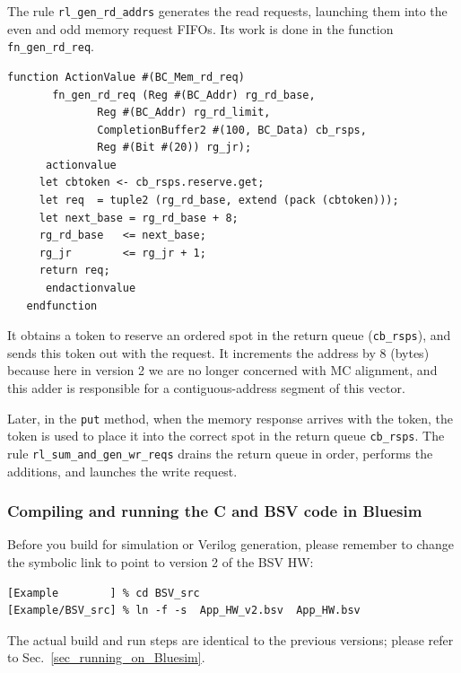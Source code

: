 \documentclass[twoside,letterpaper,11pt]{article}
\begin{document}
The rule \verb|rl_gen_rd_addrs| generates the read requests, launching
them into the even and odd memory request FIFOs.  Its work is done in
the function \verb|fn_gen_rd_req|.

\begin{Verbatim}[frame=single, label=App\_HW\_v2.bsv] 
   function ActionValue #(BC_Mem_rd_req)
       fn_gen_rd_req (Reg #(BC_Addr) rg_rd_base,
		      Reg #(BC_Addr) rg_rd_limit,
		      CompletionBuffer2 #(100, BC_Data) cb_rsps,
		      Reg #(Bit #(20)) rg_jr);
      actionvalue
	 let cbtoken <- cb_rsps.reserve.get;
	 let req  = tuple2 (rg_rd_base, extend (pack (cbtoken)));
	 let next_base = rg_rd_base + 8;
	 rg_rd_base   <= next_base;
	 rg_jr        <= rg_jr + 1;
	 return req;
      endactionvalue
   endfunction
\end{Verbatim}

It obtains a token to reserve an ordered spot in the return queue
(\verb|cb_rsps|), and sends this token out with the request.  It
increments the address by 8 (bytes) because here in version 2 we are
no longer concerned with MC alignment, and this adder is responsible
for a contiguous-address segment of this vector.

Later, in the \verb|put| method, when the memory response arrives with
the token, the token is used to place it into the correct spot in the
return queue \verb|cb_rsps|.  The rule \verb|rl_sum_and_gen_wr_reqs|
drains the return queue in order, performs the additions, and launches
the write request.


\subsubsection{Compiling and running the C and BSV code in Bluesim}

Before you build for simulation or Verilog generation, please remember
to change the symbolic link to point to version 2 of the BSV HW:

\begin{Verbatim}[frame=single, label=Properly named App\_HW.bsv application source file] 
[Example        ] % cd BSV_src
[Example/BSV_src] % ln -f -s  App_HW_v2.bsv  App_HW.bsv
\end{Verbatim}

The actual build and run steps are identical to the previous versions;
please refer to Sec.~\ref{sec_running_on_Bluesim}.
\end{document}
